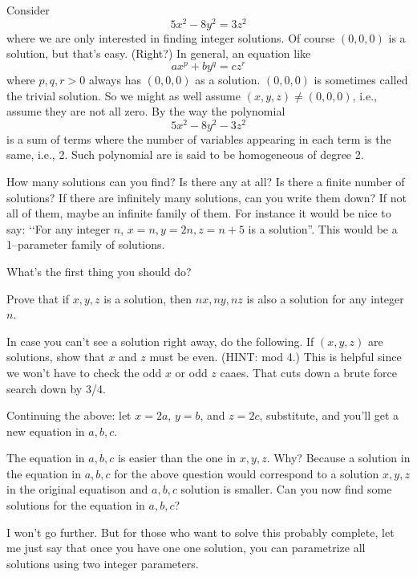 Consider
  \[
    5x^2 - 8y^2 = 3 z^2
  \]
  where we are only interested in finding integer solutions.
  Of course $(0,0,0)$ is a solution, but that's easy. (Right?)
  In general, an equation like
  \[
    ax^p + b y^q = c z^r
  \]
  where $p,q,r > 0$ always has $(0,0,0)$ as a solution.
  $(0,0,0)$ is sometimes called the trivial solution.
  So we might as well assume $(x,y,z) \neq (0,0,0)$, i.e.,
  assume they are not all zero.
  By the way the polynomial
  \[
    5x^2 - 8y^2 - 3 z^2    
  \]
  is a sum of terms where the number of variables appearing in each term is the same, i.e., 2.
  Such polynomial are is said to be homogeneous of degree 2.
  

  How many solutions can you find?
  Is there any at all?
  Is there a finite number of solutions?
  If there are infinitely many solutions, can you write them down?
  If not all of them, maybe an infinite family of them.
  For instance it would be nice to say:
  \lq\lq For any integer $n$, $x=n, y = 2n, z = n + 5$ is a solution''.
  This would be a 1--parameter family of solutions.
  
  \begin{myenum} 

  \item What's the first thing you should do?

  \item Prove that if $x,y,z$ is a solution, then
    $nx,ny,nz$ is also a solution for any integer $n$.
    
  \item
    In case you can't see a solution right away, do the following.
    If $(x,y,z)$ are solutions,
    show that $x$ and $z$ must be even.
    (HINT: mod 4.)
    This is helpful since we won't have to check the odd $x$ or odd $z$ caaes.
    That cuts down a brute force search down by 3/4.
    
  \item
    Continuing the above:
    let $x = 2a$, $y = b$, and $z = 2c$, substitute,
    and you'll get a new equation in $a,b,c$.

  \item
    The equation in $a,b,c$ is easier than the one in $x,y,z$.
    Why? Because a solution in the equation in $a,b,c$ for the above question
    would
    correspond to a solution $x,y,z$ in the original equatison and $a,b,c$
    solution is smaller. 
    Can you now find some solutions for the equation in $a,b,c$?

  \item
    I won't go further. But for those who want to solve this
    probably complete, let me just say that once you have one
    one solution, you can parametrize all solutions using
    two integer parameters.
  \end{myenum}
